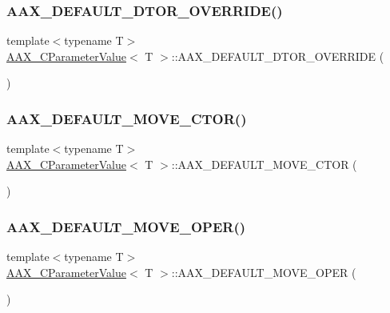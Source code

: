 \subsubsection{\texorpdfstring{AAX\_DEFAULT\_DTOR\_OVERRIDE()}{AAX\_DEFAULT\_DTOR\_OVERRIDE()}}
{\footnotesize\ttfamily template$<$typename T$>$ \\
\mbox{\hyperlink{a01533}{A\+A\+X\+\_\+\+C\+Parameter\+Value}}$<$ T $>$\+::A\+A\+X\+\_\+\+D\+E\+F\+A\+U\+L\+T\+\_\+\+D\+T\+O\+R\+\_\+\+O\+V\+E\+R\+R\+I\+DE (\begin{DoxyParamCaption}\item[{\mbox{\hyperlink{a01533}{A\+A\+X\+\_\+\+C\+Parameter\+Value}}$<$ T $>$}]{ }\end{DoxyParamCaption})}

\mbox{\label{a01533_aeeaf69b0c6c9bb83911b9e160b3b7c7f}} 
\subsubsection{\texorpdfstring{AAX\_DEFAULT\_MOVE\_CTOR()}{AAX\_DEFAULT\_MOVE\_CTOR()}}
{\footnotesize\ttfamily template$<$typename T$>$ \\
\mbox{\hyperlink{a01533}{A\+A\+X\+\_\+\+C\+Parameter\+Value}}$<$ T $>$\+::A\+A\+X\+\_\+\+D\+E\+F\+A\+U\+L\+T\+\_\+\+M\+O\+V\+E\+\_\+\+C\+T\+OR (\begin{DoxyParamCaption}\item[{\mbox{\hyperlink{a01533}{A\+A\+X\+\_\+\+C\+Parameter\+Value}}$<$ T $>$}]{ }\end{DoxyParamCaption})}

\mbox{\label{a01533_a04b9dbdf97b7b3d3e33286ade8d2f2fb}} 
\subsubsection{\texorpdfstring{AAX\_DEFAULT\_MOVE\_OPER()}{AAX\_DEFAULT\_MOVE\_OPER()}}
{\footnotesize\ttfamily template$<$typename T$>$ \\
\mbox{\hyperlink{a01533}{A\+A\+X\+\_\+\+C\+Parameter\+Value}}$<$ T $>$\+::A\+A\+X\+\_\+\+D\+E\+F\+A\+U\+L\+T\+\_\+\+M\+O\+V\+E\+\_\+\+O\+P\+ER (\begin{DoxyParamCaption}\item[{\mbox{\hyperlink{a01533}{A\+A\+X\+\_\+\+C\+Parameter\+Value}}$<$ T $>$}]{ }\end{DoxyParamCaption})}

